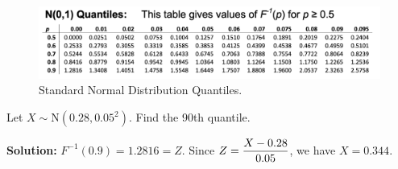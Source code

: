 \pagebreak

\begin{figure}[htbp]
    \center
    \includegraphics[scale=0.55]{img/quantiles-normal.png}
    \caption{Standard Normal Distribution Quantiles.}
\end{figure}

\begin{example}
    Let $X \sim \text{N}(0.28,0.05^2)$. Find the 90th quantile.

    \textbf{Solution:} $F^{-1}(0.9) = 1.2816 = Z$. Since $\displaystyle Z = \frac{X-0.28}{0.05}$, we have $X = 0.344$. 
\end{example}

\newpage